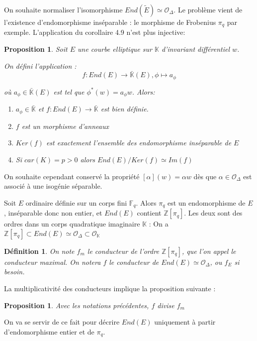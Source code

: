 \documentclass{article}
\newcommand{\Z}[0]{\mathbb{Z}}
\newcommand{\K}[0]{\mathbb{K}}
\newcommand{\Kb}[0]{\bar{\K}}
\newcommand{\OR}[0]{\mathcal{O}}
\newcommand{\F}[0]{\mathbb{F}}
\newtheorem{Prop}[The]{Proposition}
\newtheorem{Def}[The]{Définition}
\begin{document}
On souhaite normaliser l'isomorphisme $End(\tilde{E})\simeq\OR_{\Delta}$. Le problème vient de l'existence d'endomorphisme inséparable : le morphisme de Frobenius $\pi_{q}$ par exemple. L'application du corollaire 4.9 n'est plus injective:


\begin{Prop}
	Soit $E$ une courbe elliptique sur $\K$ d'invariant différentiel $w$. 
	
	On défini l'application :
	\begin{equation*}
		f : End(E)\rightarrow\Kb(E) , \phi\longmapsto a_{\phi}
	\end{equation*}
	
	où $a_{\phi}\in\Kb(E)$ est tel que $\phi^{*}(w) = a_{\phi}w$. Alors:
	
	\begin{enumerate}
		\item $a_{\phi}\in\Kb$ et $f: End(E)\rightarrow\Kb$ est bien définie. 
		\item $f$ est un morphisme d'anneaux
		\item $Ker(f)$ est exactement l'ensemble des endomorphisme inséparable de $E$
		\item Si $car(K) = p > 0$ alors $End(E)/Ker(f)\simeq Im(f)$
	\end{enumerate}
\end{Prop}

On souhaite cependant conservé la propriété $[\alpha](w) = \alpha w$ dès que $\alpha\in\OR_{\Delta}$ est associé à une isogénie séparable.

Soit $E$ ordinaire définie sur un corps fini $\F_{q}$. Alors $\pi_{q}$ est un endomorphisme de $E$, inséparable donc non entier, et $End(E)$ contient $\Z[\pi_{q}]$. Les deux sont des ordres dans un corps quadratique imaginaire $\K$ : On a $\Z[\pi_{q}]\subset End(E)\simeq\OR_{\Delta}\subset\OR_{\K}$

\begin{Def}
	On note $f_{m}$ le conducteur de l'ordre $\Z[\pi_{q}]$, que l'on appel le conducteur maximal.
	On notera $f$ le conducteur de $End(E)\simeq\OR_{\Delta}$, ou $f_{E}$ si besoin.
\end{Def}

La multiplicativité des conducteurs implique la proposition suivante :

\begin{Prop}
	Avec les notations précédentes, $f$ divise $f_{m}$
\end{Prop}

On va se servir de ce fait pour décrire $End(E)$ uniquement à partir d'endomorphisme entier et de $\pi_{q}$.
\end{document}
